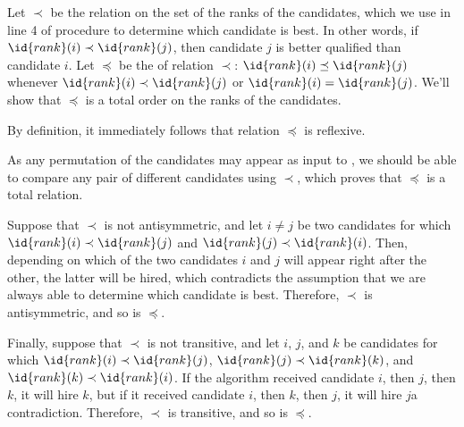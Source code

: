 Let $\prec$ be the relation on the set of the ranks of the candidates, which we use in line 4 of procedure  to determine which candidate is best.
In other words, if $\id{rank}(i)\prec\id{rank}(j)$, then candidate $j$ is better qualified than candidate $i$.
Let $\preceq$ be the  of relation $\prec$: $\id{rank}(i)\preceq\id{rank}(j)$ whenever $\id{rank}(i)\prec\id{rank}(j)$ or $\id{rank}(i)=\id{rank}(j)$.
We'll show that $\preceq$ is a total order on the ranks of the candidates.

By definition, it immediately follows that relation $\preceq$ is reflexive.

As any permutation of the candidates may appear as input to , we should be able to compare any pair of different candidates using $\prec$, which proves that $\preceq$ is a total relation.

Suppose that $\prec$ is not antisymmetric, and let $i\ne j$ be two candidates for which $\id{rank}(i)\prec\id{rank}(j)$ and $\id{rank}(j)\prec\id{rank}(i)$.
Then, depending on which of the two candidates $i$ and $j$ will appear right after the other, the latter will be hired, which contradicts the assumption that we are always able to determine which candidate is best.
Therefore, $\prec$ is antisymmetric, and so is $\preceq$.

Finally, suppose that $\prec$ is not transitive, and let $i$, $j$, and $k$ be candidates for which $\id{rank}(i)\prec\id{rank}(j)$, $\id{rank}(j)\prec\id{rank}(k)$, and $\id{rank}(k)\prec\id{rank}(i)$.
If the algorithm received candidate $i$, then $j$, then $k$, it will hire $k$, but if it received candidate $i$, then $k$, then $j$, it will hire $j$\dash a contradiction.
Therefore, $\prec$ is transitive, and so is $\preceq$.
